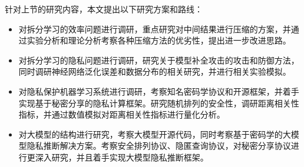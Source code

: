 针对上节的研究内容，本文提出以下研究方案和路线：
\begin{itemize}
    \item 对拆分学习的效率问题进行调研，重点研究对中间结果进行压缩的方案，并通过实验分析和理论分析考察各种压缩方法的优劣性，提出进一步改进思路。
    \item 对拆分学习的隐私问题进行调研，研究关于模型补全攻击的攻击和防御方法，同时调研神经网络泛化误差和数据分布的相关研究，并进行相关实验模拟。
    \item 对隐私保护机器学习系统进行调研，考察知名密码学协议和开源框架，并着手实现基于秘密分享的隐私计算框架。研究随机排列的安全性，调研距离相关性指标，并通过数值模拟对距离相关性指标进行量化分析。
    \item 对大模型的结构进行研究，考察大模型开源代码，同时考察基于密码学的大模型隐私推断解决方案。考察安全排列协议、隐匿查询协议，对秘密分享协议进行更深入研究，并且着手实现大模型隐私推断框架。
\end{itemize}